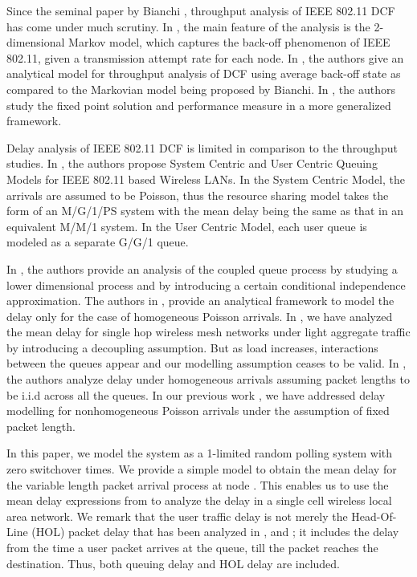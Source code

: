 \documentclass[10pt, conference, compsocconf]{IEEEtran}
\begin{document}
Since the seminal paper by Bianchi \cite{bianchi}, throughput analysis of IEEE 802.11 DCF has come under much scrutiny. In \cite{bianchi}, the main feature of the analysis is the 2-dimensional Markov model, which captures the back-off phenomenon of IEEE 802.11, given a transmission attempt rate for each node. In \cite{tay}, the authors give an analytical model for throughput analysis of DCF using average back-off state as compared to the Markovian model being proposed by Bianchi. In \cite{akumar}, the authors study the fixed point solution and performance measure in a more generalized framework.

Delay analysis of IEEE 802.11 DCF is limited in comparison to the throughput studies. In \cite{tobagi}, the authors propose System Centric and User Centric Queuing Models for IEEE 802.11 based Wireless LANs. In the System Centric Model, the arrivals are assumed to be Poisson, thus the resource sharing model takes the form of an M/G/1/PS system with the mean delay being the same as that in an equivalent M/M/1 system. In the User Centric  Model, each user queue is modeled as a separate G/G/1 queue. 

In \cite{panda}, the authors provide an analysis of the coupled queue process by studying a lower dimensional process and by introducing a certain conditional independence approximation. The authors in \cite{panda}, provide an analytical framework to model the delay only for the case of homogeneous Poisson arrivals. In \cite{joy}, we have analyzed the mean delay for single hop wireless mesh networks under light aggregate traffic by introducing a decoupling assumption. But as load increases, interactions between the queues appear and our modelling assumption ceases to be valid. In \cite{tickoo}, the authors analyze delay under homogeneous arrivals assuming packet lengths to be i.i.d across all the queues. In our previous work \cite{saurabh}, we have addressed delay modelling for nonhomogeneous Poisson arrivals under the assumption of fixed packet length.

In this paper, we model the system as a 1-limited random polling system with zero switchover times. We provide a simple model to obtain the mean delay for the variable length packet arrival process at node . This enables us to use the mean delay expressions from \cite{lee} to analyze the delay in a single cell wireless local area network. We remark that the user traffic delay is not merely the Head-Of-Line (HOL) packet delay that has been analyzed in \cite{bianchi}, \cite{tay} and \cite{akumar}; it includes the delay from the time a user packet arrives at the queue, till the packet reaches the destination. Thus, both queuing delay and HOL delay are included. 
\end{document}

